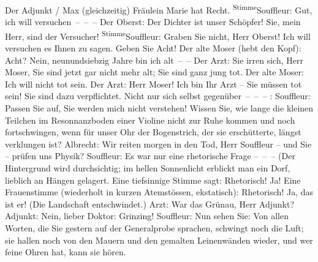 \begin{ledgroupsized}[t]{13cm}
           \pstart
           Der Adjunkt / Max (gleichzeitig) Fräulein Marie hat Recht.\pend
           \pstart
           \substVorne{}\textsuperscript{Stimme}{\allowbreak}\substDazwischen{}Souffleur\substHinten{}: Gut, ich will versuchen – – –\pend
           \pstart
           Der Oberst: Der Dichter ist unser Schöpfer! Sie, mein Herr, sind der Versucher!\pend
           \pstart
           \substVorne{}\textsuperscript{Stimme}{\allowbreak}\substDazwischen{}Souffleur\substHinten{}: Graben Sie nicht, Herr Oberst! Ich will versuchen es Ihnen zu sagen. Geben
               Sie Acht!\pend
           \pstart
           Der alte Moser (hebt den Kopf): Acht? Nein, neunundsiebzig Jahre bin ich alt – –\pend
           \pstart
           Der Arzt: Sie irren sich, Herr Moser, Sie sind jetzt gar nicht mehr alt; Sie sind
               ganz jung tot.\pend
           \pstart
           Der alte Moser: Ich will nicht tot sein.\pend
           \pstart
           Der Arzt: Herr Moser! Ich bin Ihr Arzt – Sie müssen tot sein! Sie sind dazu
               verpflichtet. Nicht nur sich selbst gegenüber – – –\pend
           \pstart
           \introOben{}: \introOben{}Souffleur: Passen Sie auf, Sie
               werden mich nicht verstehen! Wissen Sie, wie lange die kleinen Teilchen im
               Resonnanzboden einer Violine nicht zur Ruhe kommen und noch
               fortschwingen, wenn für unser Ohr der Bogenstrich, der sie erschütterte, längst
               verklungen ist?\pend
           \pstart
           Albrecht: Wir reiten morgen in den Tod, Herr Souffleur – und Sie – prüfen uns
               Physik?\pend
           \pstart
           {\pb}Souffleur: Es war nur eine
               rhetorische Frage – – –\pend
           \pstart
           (Der Hintergrund wird durchsichtig; im hellen Sonnenlicht erblickt man ein Dorf,
               lieblich an Hängen gelagert. Eine tiefsinnige Stimme sagt:\pend
           \pstart
           Rhetorisch! Ja!\pend
           \pstart
           Eine Frauenstimme (wiederholt in kurzen Atemstössen, ekstatisch): Rhetorisch! Ja, das
               ist er!\pend
           \pstart
           (Die Landschaft entschwindet.)\pend
           \pstart
           Arzt: War das Grünau, Herr Adjunkt?\pend
           \pstart
           Adjunkt: Nein, lieber Doktor: Grinzing!\pend
           \pstart
           Souffleur: Nun sehen Sie: Von allen Worten, die Sie gestern auf der Generalprobe
               sprachen, schwingt noch die Luft; sie hallen noch von den Mauern und den gemalten
               Leinenwänden wieder, und wer feine Ohren hat, kann sie hören.\pend

\end{ledgroupsized}
